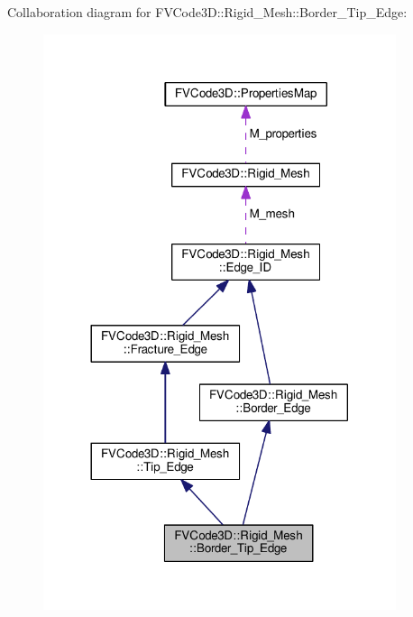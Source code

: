 Collaboration diagram for F\+V\+Code3D\+:\+:Rigid\+\_\+\+Mesh\+:\+:Border\+\_\+\+Tip\+\_\+\+Edge\+:
\nopagebreak
\begin{figure}[H]
\begin{center}
\leavevmode
\includegraphics[width=293pt]{classFVCode3D_1_1Rigid__Mesh_1_1Border__Tip__Edge__coll__graph}
\end{center}
\end{figure}
